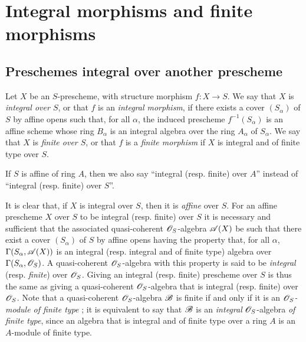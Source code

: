 \section{Integral morphisms and finite morphisms}
\label{section:II.6}


\subsection{Preschemes integral over another prescheme}
\label{subsection:II.6.1}

\begin{definition}[6.1.1]
\label{II.6.1.1}
Let $X$ be an $S$-prescheme, with structure morphism $f:X\to S$.
We say that $X$ is \emph{integral over $S$}, or that $f$ is an \emph{integral morphism}, if there exists a cover $(S_\alpha)$ of $S$ by affine opens such that, for all $\alpha$, the induced prescheme $f^{-1}(S_\alpha)$ is an affine scheme whose ring $B_\alpha$ is an integral algebra over the ring $A_\alpha$ of $S_\alpha$.
We say that $X$ is \emph{finite over $S$}, or that $f$ is a \emph{finite morphism} if $X$ is integral and of finite type over $S$.
\end{definition}

If $S$ is affine of ring $A$, then we also say ``integral (resp. finite) over $A$'' instead of ``integral (resp. finite) over $S$''.

\begin{env}[6.1.2]
\label{II.6.1.2}
It is clear that, if $X$ is integral over $S$, then it is \emph{affine} over $S$.
For an affine prescheme $X$ over $S$ to be integral (resp. finite) over $S$ it is necessary and sufficient that the associated quasi-coherent $\mathscr{O}_S$-algebra $\mathscr{A}(X)$ be such that there exist a cover $(S_\alpha)$ of $S$ by affine opens having the property that, for all $\alpha$, $\Gamma(S_\alpha,\mathscr{A}(X))$ is an integral (resp. integral and of finite type) algebra over $\Gamma(S_\alpha,\mathscr{O}_S)$.
A quasi-coherent $\mathscr{O}_S$-algebra with this property is said to be \emph{integral} (resp. \emph{finite}) over $\mathscr{O}_S$.
Giving an integral (resp. finite) prescheme over $S$ is thus  the same as giving a quasi-coherent $\mathscr{O}_S$-algebra that is integral (resp. finite) over $\mathscr{O}_S$.
Note that a quasi-coherent $\mathscr{O}_S$-algebra $\mathscr{B}$ is finite if and only if it is an \emph{$\mathscr{O}_S$-module of finite type} ;
it is equivalent to say that $\mathscr{B}$ is an \emph{integral} $\mathscr{O}_S$-algebra \emph{of finite type}, since an algebra that is integral and of finite type over a ring $A$ is an $A$-module of finite type.
\end{env}

